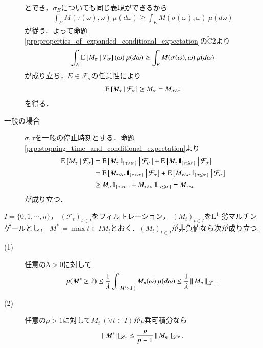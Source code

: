 \begin{prf}
\begin{description}
\begin{align}
				\end{align}
				とでき，$\sigma_E$についても同じ表現ができるから
				\begin{align}
					\int_E M(\tau(\omega),\omega)\ \mu(d\omega) \geq \int_E M(\sigma(\omega),\omega)\ \mu(d\omega)
				\end{align}
				が従う．よって命題\ref{prp:properties_of_expanded_conditional_expectation}の$\tilde{\mathrm{C}}$2より
				\begin{align}
					\int_E \cexp{M_\tau}{\mathcal{F}_\sigma}(\omega)\ \mu(d\omega) \geq \int_E M(\sigma(\omega),\omega)\ \mu(d\omega)
				\end{align}
				が成り立ち，$E \in \mathcal{F}_\sigma$の任意性により
				\begin{align}
					\operatorname{E} \left[ M_\tau \ \middle|\ \mathcal{F}_\sigma \right] \geq M_\sigma = M_{\sigma \wedge \tau}
				\end{align}
				を得る．
			
			\item[一般の場合]
				$\sigma,\tau$を一般の停止時刻とする．命題\ref{prp:stopping_time_and_conditional_expectation}より
				\begin{align}
					\operatorname{E} \left[ M_\tau \ \middle|\ \mathcal{F}_\sigma \right]
					&= \operatorname{E} \left[ M_\tau \mbox{1}\hspace{-0.25em}\mbox{l}_{\{\, \tau > \sigma \, \}} \ \middle|\ \mathcal{F}_\sigma \right] + \operatorname{E} \left[ M_\tau \mbox{1}\hspace{-0.25em}\mbox{l}_{\{\, \tau \leq \sigma \, \}} \ \middle|\ \mathcal{F}_\sigma \right] \\
					&= \operatorname{E} \left[ M_{\tau \vee \sigma} \mbox{1}\hspace{-0.25em}\mbox{l}_{\{\, \tau > \sigma \, \}} \ \middle|\ \mathcal{F}_\sigma \right] + \operatorname{E} \left[ M_{\tau \wedge \sigma} \mbox{1}\hspace{-0.25em}\mbox{l}_{\{\, \tau \leq \sigma \, \}} \ \middle|\ \mathcal{F}_\sigma \right] \\
					&\geq M_{\sigma} \mbox{1}\hspace{-0.25em}\mbox{l}_{\{\, \tau > \sigma \, \}} + M_{\tau \wedge \sigma} \mbox{1}\hspace{-0.25em}\mbox{l}_{\{\, \tau \leq \sigma \, \}}
					= M_{\tau \wedge \sigma}
				\end{align}
				が成り立つ．
		\end{description}
		\QED
	\end{prf}

	\begin{itembox}[l]{}
		\begin{thm}[Doobの不等式(1)]
			$I=\{0,1,\cdots,n\}$，
			$(\mathcal{F}_t)_{t \in I}$をフィルトレーション，
			$(M_t)_{t \in I}$を$\mathrm{L}^1$-劣マルチンゲールとし，
			$M^* \coloneqq \max{t \in I}{M_t}$とおく．$(M_t)_{t \in I}$が非負値なら次が成り立つ:
			\begin{description}
				\item[(1)] 任意の$\lambda > 0$に対して
					\begin{align}
						\mu(M^* \geq \lambda) \leq \frac{1}{\lambda} \int_{\left\{\ M^* \geq \lambda\ \right\}} M_n(\omega)\ \mu(d\omega)
						\leq \frac{1}{\lambda} \left\|\, M_n\, \right\|_{\mathscr{L}^1}.
					\end{align}
				\item[(2)] 任意の$p > 1$に対して$M_t\ (\forall t \in I)$が$p$乗可積分なら
					\begin{align}
						\left\|\, M^*\, \right\|_{\mathscr{L}^p} \leq \frac{p}{p-1} \left\|\, M_n\, \right\|_{\mathscr{L}^p}.
					\end{align}
			\end{description}
		\end{thm}
	\end{itembox}
	
